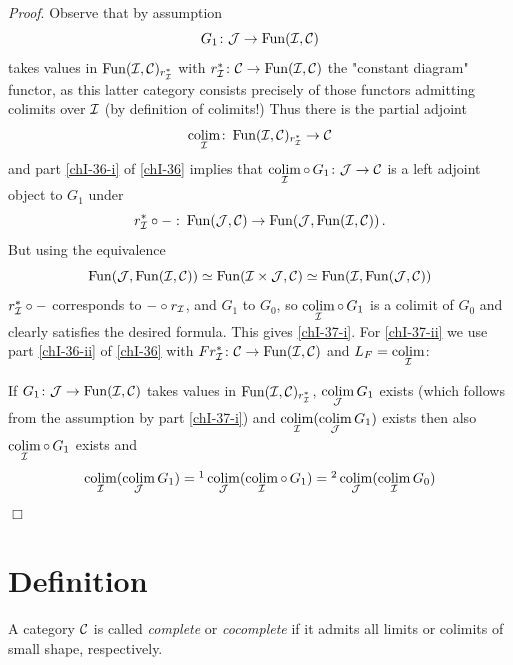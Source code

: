         \emph{Proof}. Observe that by assumption
        \begin{equation*}
            G_1 \colon \mathcal{J} \to \operatorname{Fun}(\mathcal{I}, \mathcal{C})
        \end{equation*}
        takes values in $\operatorname{Fun}(\mathcal{I}, \mathcal{C})_{r^*_{\mathcal{I}}}$ with $r^*_{\mathcal{I}} \colon \mathcal{C} \to \operatorname{Fun}(\mathcal{I},\mathcal{C})$ the "constant diagram" functor, as this latter category consists precisely of those functors admitting colimits over $\mathcal{I}$ (by definition of colimits!) Thus there is the partial adjoint
        \begin{equation*}
            \operatorname*{colim}\limits_{\mathcal{I}} \colon \operatorname{Fun}(\mathcal{I}, \mathcal{C})_{r^*_{\mathcal{I}}} \to \mathcal{C}
        \end{equation*}
        and part \ref{chI-36-i} of \ref{chI-36} implies that $\operatorname*{colim}\limits_{\mathcal{I}} \circ \, G_1 \colon \mathcal{J} \to \mathcal{C}$ is a left adjoint object to $G_1$ under
        \begin{equation*}
            r^*_{\mathcal{I}} \circ - \,\colon \operatorname{Fun}(\mathcal{J}, \mathcal{C}) \to \operatorname{Fun}(\mathcal{J}, \operatorname{Fun}(\mathcal{I}, \mathcal{C})) \,.
        \end{equation*}
        But using the equivalence
        \begin{equation*}
            \operatorname{Fun}(\mathcal{J}, \operatorname{Fun}(\mathcal{I}, \mathcal{C})) \simeq \operatorname{Fun}(\mathcal{I} \times \mathcal{J}, \mathcal{C}) \simeq \operatorname{Fun}(\mathcal{I}, \operatorname{Fun}(\mathcal{J}, \mathcal{C}))
        \end{equation*}
        $r^*_{\mathcal{I}} \circ -$ corresponds to $- \circ r_{\mathcal{I}}$, and $G_1$ to $G_0$, so $\operatorname*{colim}\limits_{\mathcal{I}} \circ \, G_1$ is a colimit of $G_0$ and clearly satisfies the desired formula. This gives \ref{chI-37-i}. For \ref{chI-37-ii} we use part \ref{chI-36-ii} of \ref{chI-36} with $F r^*_{\mathcal{I}} \colon \mathcal{C} \to \operatorname{Fun}(\mathcal{I}, \mathcal{C})$ and $L_F = \operatorname*{colim}\limits_{\mathcal{I}}$:

        If $G_1 \colon \mathcal{J} \to \operatorname{Fun}(\mathcal{I}, \mathcal{C})$ takes values in $\operatorname{Fun}(\mathcal{I}, \mathcal{C})_{r^*_{\mathcal{I}}}$, $\operatorname*{colim}\limits_{\mathcal{J}} G_1$ exists (which follows from the assumption by part \ref{chI-37-i}) and $\operatorname*{colim}\limits_{\mathcal{I}}(\operatorname*{colim}\limits_{\mathcal{J}} G_1)$ exists then also $\operatorname*{colim}\limits_{\mathcal{I}} \circ \, G_1$ exists and
        \begin{equation*}
            \colim\limits_{\Ii}(\colim\limits_{\Jj} G_1) =\footnotemark \colim\limits_{\Jj}(\colim\limits_{\Ii} \circ \, G_1) =\footnotemark \colim\limits_{\Jj}(\colim\limits_{\Ii} G_0)
        \end{equation*}
        \hfill\(\Box\)
        \addtocounter{footnote}{-2}
    \section{Definition}
        A category $\mathcal{C}$ is called \emph{complete} or \emph{cocomplete} if it admits all limits or colimits of small shape, respectively.

